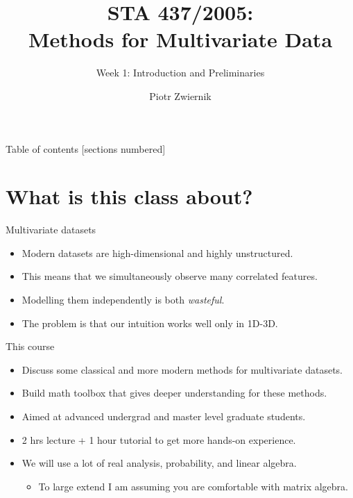 \documentclass[11pt,handout,aspectratio=169]{beamer}
\title[STA437-Week1]{STA 437/2005: \\ Methods for Multivariate Data}
\subtitle[]{Week 1: Introduction and Preliminaries}
\author[Prob Learning]{Piotr Zwiernik}
\institute[UofT]{University of Toronto}
\date{}
\begin{document}
\maketitle

\begin{frame}{Table of contents}
  [sections numbered]
  \tableofcontents%
\end{frame}



\section{What is this class about?}


\begin{frame}{Multivariate datasets}
\begin{itemize}
	\item Modern datasets are high-dimensional and highly unstructured.\\[.7cm]
	\item This means that we simultaneously observe many correlated features. \\[.7cm]
	\item Modelling them independently is both \emph{wasteful}.\\[.7cm]
	\item The problem is that our intuition works well only in 1D-3D.
\end{itemize}	
\end{frame}

\begin{frame}{This course}
  \begin{itemize}
  \item Discuss some classical and more modern methods for multivariate datasets.\\[.7cm]
  \item Build math toolbox that gives deeper understanding for these methods.\\[.7cm]
  \item Aimed at advanced undergrad and master level graduate students. \\[.7cm]
  \item 2 hrs lecture + 1 hour tutorial to get more hands-on experience. \\[.7cm]
  \item We will use \alert{a lot of} real analysis, probability, and linear algebra. 
  \begin{itemize}
\item To large extend I am assuming you are comfortable with matrix algebra. 
  \end{itemize}  
  \end{itemize}
\end{frame}
\end{document}

